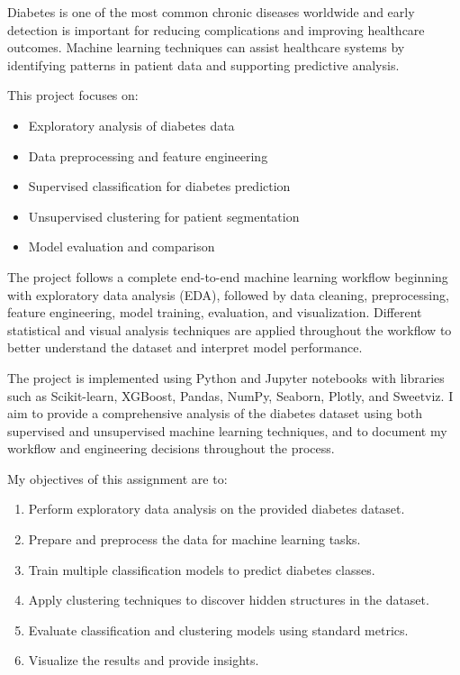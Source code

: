 ﻿\documentclass{article}
\makeatletter
\let\old@subsection\subsection
\renewcommand{\subsection}{\@ifstar{\subsection@star}{\subsection@nostar}}
\newcommand{\subsection@nostar}{\@ifnextchar[{\subsection@nostar@opt}{\subsection@nostar@noopt}}
\newcommand{\subsection@nostar@opt}[2]{\old@subsection[#1]{\uline{#2}}}
\newcommand{\subsection@nostar@noopt}[1]{\old@subsection{\uline{#1}}}
\newcommand{\subsection@star}[1]{\old@subsection*{\uline{#1}}}
\makeatother
\begin{document}
\subsection{Background}

Diabetes is one of the most common chronic diseases worldwide and early detection is important for reducing complications and improving healthcare outcomes.
Machine learning techniques can assist healthcare systems by identifying patterns in patient data and supporting predictive analysis.

This project focuses on:
\begin{itemize}
    \item Exploratory analysis of diabetes data
    \item Data preprocessing and feature engineering
    \item Supervised classification for diabetes prediction
    \item Unsupervised clustering for patient segmentation
    \item Model evaluation and comparison
\end{itemize}

The project follows a complete end-to-end machine learning workflow beginning with exploratory data analysis (EDA), followed by data cleaning, preprocessing, feature engineering, model training, evaluation, and visualization. 
Different statistical and visual analysis techniques are applied throughout the workflow to better understand the dataset and interpret model performance.

The project is implemented using Python and Jupyter notebooks with libraries such as Scikit-learn, XGBoost, Pandas, NumPy, Seaborn, Plotly, and Sweetviz.
I aim to provide a comprehensive analysis of the diabetes dataset using both supervised and unsupervised machine learning techniques, 
and to document my workflow and engineering decisions throughout the process. 
 
\subsection{Objectives}
My objectives of this assignment are to:
\begin{enumerate}
    \item Perform exploratory data analysis on the provided diabetes dataset.
    \item Prepare and preprocess the data for machine learning tasks.
    \item Train multiple classification models to predict diabetes classes.
    \item Apply clustering techniques to discover hidden structures in the dataset.
    \item Evaluate classification and clustering models using standard metrics.
    \item Visualize the results and provide insights.
\end{enumerate}
\end{document}
